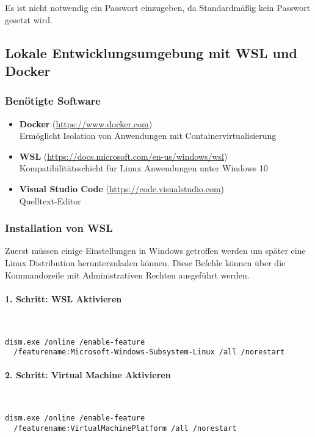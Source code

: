 Es ist nicht notwendig ein Passwort einzugeben, da Standardmäßig kein Passwort
gesetzt wird.

\subsection{Lokale Entwicklungsumgebung mit WSL und Docker}

\subsubsection{Benötigte Software}

\begin{itemize}
  \item \textbf{Docker} (\url{https://www.docker.com}) \\ Ermöglicht Isolation
  von Anwendungen mit Containervirtualisierung
  \item \textbf{WSL} (\url{https://docs.microsoft.com/en-us/windows/wsl}) \\
  Kompatibilitätsschicht für Linux Anwendungen unter Windows 10
  \item \textbf{Visual Studio Code} (\url{https://code.visualstudio.com}) \\
  Quelltext-Editor
\end{itemize}

\subsubsection{Installation von WSL}
Zuerst müssen einige Einstellungen in Windows getroffen werden um später eine
Linux Distribution herunterzuladen können. Diese Befehle können über die
Kommandozeile mit Administrativen Rechten ausgeführt werden.

\paragraph{1. Schritt: WSL Aktivieren}\mbox{}\\
\begin{lstlisting}[caption={WSL Feature Feature aktivierens}, captionpos=b]
  dism.exe /online /enable-feature
  /featurename:Microsoft-Windows-Subsystem-Linux /all /norestart
\end{lstlisting}

\paragraph{2. Schritt: Virtual Machine Aktivieren}\mbox{}\\
\begin{lstlisting}[caption={Virtual Machine Feature aktivieren}, captionpos=b]
  dism.exe /online /enable-feature
  /featurename:VirtualMachinePlatform /all /norestart
\end{lstlisting}

